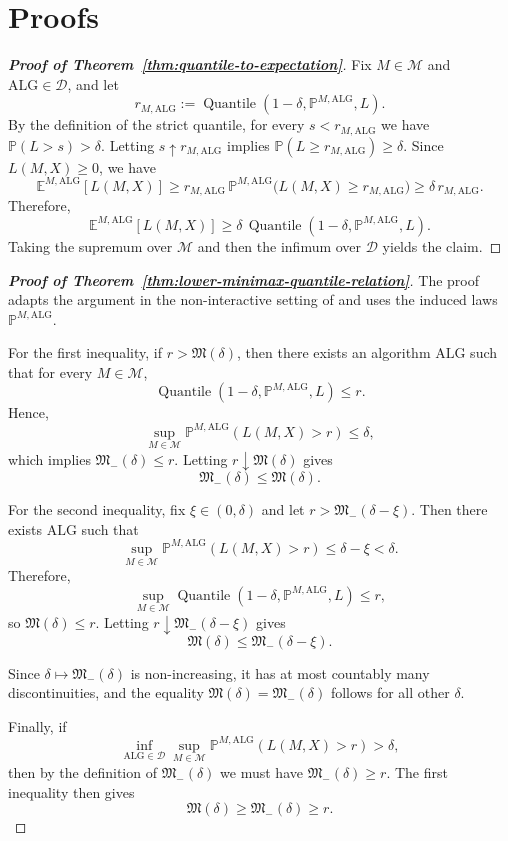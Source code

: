 \documentclass[journal]{IEEEtran}
\newcommand{\ALG}{\mathrm{ALG}}
\newcommand{\Quantile}{\operatorname{Quantile}}
\begin{document}
\section{Proofs}
\begin{proof}[\textbf{Proof of Theorem~\ref{thm:quantile-to-expectation}}]
Fix \(M\in\mathcal M\) and \(\ALG\in\mathcal D\), and let
\[
r_{M,\ALG}
:=
\Quantile(1-\delta,\mathbb P^{M,\ALG},L).
\]
By the definition of the strict quantile, for every \(s<r_{M,\ALG}\)
we have \(\mathbb P(L>s)>\delta\). Letting \(s\uparrow r_{M,\ALG}\) implies
\(\mathbb P(L\ge r_{M,\ALG})\ge\delta\).
Since \(L(M,X)\ge 0\), we have
\[
\mathbb E^{M,\ALG}[L(M,X)]
\ge
r_{M,\ALG}\,
\mathbb P^{M,\ALG}\bigl(L(M,X)\ge r_{M,\ALG}\bigr)
\ge
\delta\, r_{M,\ALG}.
\]
Therefore,
\[
\mathbb E^{M,\ALG}[L(M,X)]
\ge
\delta\,
\Quantile(1-\delta,\mathbb P^{M,\ALG},L).
\]
Taking the supremum over \(\mathcal M\) and then the infimum over \(\mathcal D\) yields the claim.
\end{proof}
\begin{proof}[\textbf{Proof of Theorem~\ref{thm:lower-minimax-quantile-relation}}]
    The proof adapts the argument in the non-interactive setting of \cite[Thm.~4]{ma2024high} and uses the induced laws \(\mathbb P^{M,\ALG}\).

For the first inequality, if \(r>\mathfrak M(\delta)\), then there exists an algorithm \(\ALG\) such that for every \(M\in\mathcal M\),
\[
\Quantile(1-\delta,\mathbb P^{M,\ALG},L)\le r.
\]
Hence,
\[
\sup_{M\in\mathcal M}\mathbb P^{M,\ALG}(L(M,X)>r)\le \delta,
\]
which implies \(\mathfrak M_{-}(\delta)\le r\). Letting \(r\downarrow \mathfrak M(\delta)\) gives
\[
\mathfrak M_{-}(\delta)\le \mathfrak M(\delta).
\]

For the second inequality, fix \(\xi\in(0,\delta)\) and let \(r>\mathfrak M_{-}(\delta-\xi)\). Then there exists \(\ALG\) such that
\[
\sup_{M\in\mathcal M}\mathbb P^{M,\ALG}(L(M,X)>r)\le \delta-\xi < \delta.
\]
Therefore,
\[
\sup_{M\in\mathcal M}\Quantile(1-\delta,\mathbb P^{M,\ALG},L)\le r,
\]
so \(\mathfrak M(\delta)\le r\). Letting \(r\downarrow \mathfrak M_{-}(\delta-\xi)\) gives
\[
\mathfrak M(\delta)\le \mathfrak M_{-}(\delta-\xi).
\]

Since \(\delta\mapsto \mathfrak M_{-}(\delta)\) is non-increasing, it has at most countably many discontinuities, and the equality \(\mathfrak M(\delta)=\mathfrak M_{-}(\delta)\) follows for all other \(\delta\).

Finally, if
\[
\inf_{\ALG\in\mathcal D}\sup_{M\in\mathcal M}\mathbb P^{M,\ALG}(L(M,X)>r)>\delta,
\]
then by the definition of \(\mathfrak M_{-}(\delta)\) we must have \(\mathfrak M_{-}(\delta)\ge r\). The first inequality then gives
\[
\mathfrak M(\delta)\ge \mathfrak M_{-}(\delta)\ge r.
\]
\end{proof}
\end{document}
